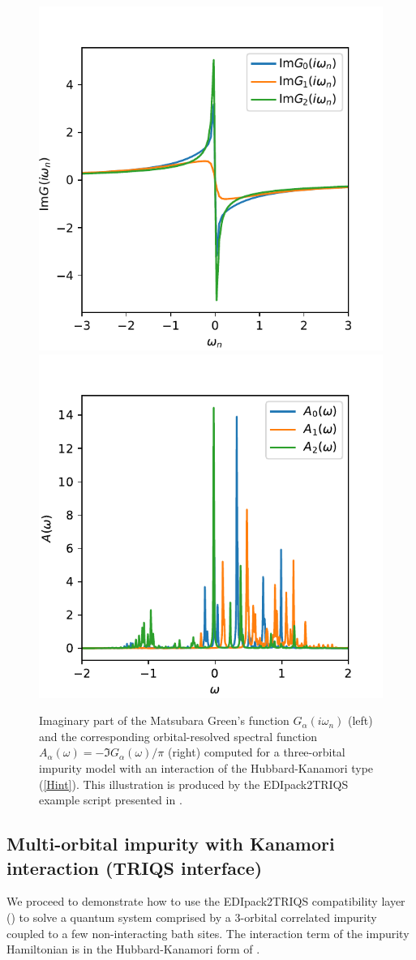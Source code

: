 \documentclass[edipack_sp.tex]{subfiles}
\begin{document}
\begin{figure}[t!]
    \includegraphics[width=0.5\linewidth]
        {edipack2_examples/edipack2triqs/G_iw.pdf}
    \includegraphics[width=0.5\linewidth]
        {edipack2_examples/edipack2triqs/A_w.pdf}
    \caption{\label{figEx3}%
        Imaginary part of the Matsubara Green's function $G_\alpha(i\omega_n)$ (left) and the
        corresponding orbital-resolved spectral function $A_\alpha(\omega) = -\Im{G_\alpha(\omega)} / \pi$ (right) computed for a
        three-orbital impurity model with an interaction of the Hubbard-Kanamori
        type (\ref{Hint}). This illustration is produced by the EDIpack2TRIQS
        example script presented in .
    }
\end{figure}

\subsection{Multi-orbital impurity with Kanamori
  interaction (TRIQS interface)}
\label{SecExamplesTRIQS}

We proceed to demonstrate how to use the EDIpack2TRIQS compatibility
layer () to solve a quantum system comprised by a
3-orbital correlated impurity coupled to a few non-interacting bath sites.
The interaction term of the impurity Hamiltonian is in the Hubbard-Kanamori
form of .
\end{document}
